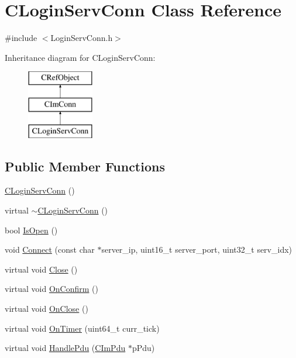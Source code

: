 \hypertarget{class_c_login_serv_conn}{}\section{C\+Login\+Serv\+Conn Class Reference}
\label{class_c_login_serv_conn}


{\ttfamily \#include $<$Login\+Serv\+Conn.\+h$>$}

Inheritance diagram for C\+Login\+Serv\+Conn\+:\begin{figure}[H]
\begin{center}
\leavevmode
\includegraphics[height=3.000000cm]{class_c_login_serv_conn}
\end{center}
\end{figure}
\subsection*{Public Member Functions}
\begin{DoxyCompactItemize}
\item 
\hyperlink{class_c_login_serv_conn_a0e92fe21408136a97d2fa610ac1c76c2}{C\+Login\+Serv\+Conn} ()
\item 
virtual \hyperlink{class_c_login_serv_conn_acf9687d64da82f956f188c9df6be0a5d}{$\sim$\+C\+Login\+Serv\+Conn} ()
\item 
bool \hyperlink{class_c_login_serv_conn_a504b1b8e6d872f806acf5d01916b7027}{Is\+Open} ()
\item 
void \hyperlink{class_c_login_serv_conn_a5bf8dd4eeb61d7b6a234df0c4fc43e13}{Connect} (const char $\ast$server\+\_\+ip, uint16\+\_\+t server\+\_\+port, uint32\+\_\+t serv\+\_\+idx)
\item 
virtual void \hyperlink{class_c_login_serv_conn_a7d32c9f06c504bf6ac3553dd8dbceb0c}{Close} ()
\item 
virtual void \hyperlink{class_c_login_serv_conn_ae0a26aeeeea61a25bf54de47fd21c42e}{On\+Confirm} ()
\item 
virtual void \hyperlink{class_c_login_serv_conn_af4b27bd54cd4607ef4c597a352552b07}{On\+Close} ()
\item 
virtual void \hyperlink{class_c_login_serv_conn_ae29f6ac0896b52065fab58d6a4d4ed20}{On\+Timer} (uint64\+\_\+t curr\+\_\+tick)
\item 
virtual void \hyperlink{class_c_login_serv_conn_a76ce659970c3a2f7b8f841f7ad9713d7}{Handle\+Pdu} (\hyperlink{class_c_im_pdu}{C\+Im\+Pdu} $\ast$p\+Pdu)
\end{DoxyCompactItemize}

